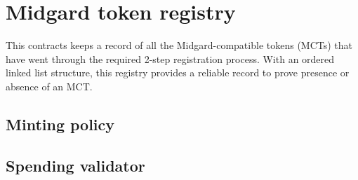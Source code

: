 \documentclass[../midgard.tex]{subfiles}
\begin{document}
\section{Midgard token registry}
\label{h:midgard-token-registry}

This contracts keeps a record of all the Midgard-compatible tokens (MCTs) that have went through the required 2-step registration process.
With an ordered linked list structure, this registry provides a reliable record to prove presence or absence of an MCT.

\subsection{Minting policy}
\label{h:hub-oracle-minting-policy}

\subsection{Spending validator}
\label{h:hub-oracle-spending-validator}
\end{document}
